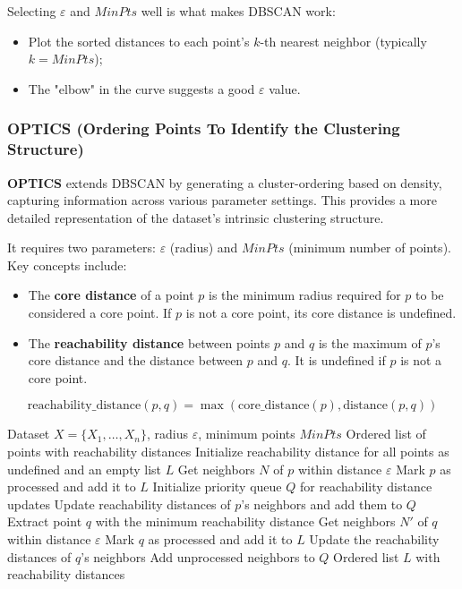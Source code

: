 Selecting $\varepsilon$ and $MinPts$ well is what makes DBSCAN work:
\begin{itemize}
    \item Plot the sorted distances to each point's $k$-th nearest neighbor (typically $k = MinPts$);
    \item The "elbow" in the curve suggests a good $\varepsilon$ value.
\end{itemize}

\subsubsection{OPTICS (Ordering Points To Identify the Clustering Structure)}
\textbf{OPTICS} extends DBSCAN by generating a cluster-ordering based on density, capturing information across various parameter settings. This provides a more detailed representation of the dataset's intrinsic clustering structure.

It requires two parameters: $\varepsilon$ (radius) and $MinPts$ (minimum number of points). Key concepts include:

\begin{itemize}
    \item The \textbf{core distance} of a point $p$ is the minimum radius required for $p$ to be considered a core point. If $p$ is not a core point, its core distance is undefined.
    \item The \textbf{reachability distance} between points $p$ and $q$ is the maximum of $p$'s core distance and the distance between $p$ and $q$. It is undefined if $p$ is not a core point.
\end{itemize}
\begin{equation}
\text{reachability\_distance}(p, q) = \max(\text{core\_distance}(p), \text{distance}(p, q))
\end{equation}

\begin{algorithm}
\caption{OPTICS Clustering Algorithm}
\label{alg:optics}
\begin{algorithmic}[1]
\Require Dataset $X = \{X_1, \ldots, X_n\}$, radius $\varepsilon$, minimum points $MinPts$
\Ensure Ordered list of points with reachability distances
\State Initialize reachability distance for all points as undefined and an empty list $L$
    \State Get neighbors $N$ of $p$ within distance $\varepsilon$
    \State Mark $p$ as processed and add it to $L$
        \State Initialize priority queue $Q$ for reachability distance updates
        \State Update reachability distances of $p$'s neighbors and add them to $Q$
            \State Extract point $q$ with the minimum reachability distance
            \State Get neighbors $N'$ of $q$ within distance $\varepsilon$
            \State Mark $q$ as processed and add it to $L$
                \State Update the reachability distances of $q$'s neighbors
                \State Add unprocessed neighbors to $Q$
            \EndIf
        \EndWhile
    \EndIf
\EndFor
\State \Return Ordered list $L$ with reachability distances
\end{algorithmic}
\end{algorithm}

